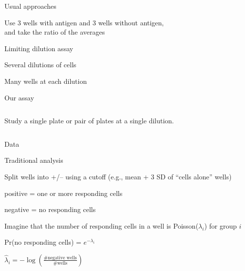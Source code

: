 \documentclass[aspectratio=169,12pt,t]{beamer}
\begin{document}
\begin{frame}{Usual approaches}

  \bbi

\item Use 3 wells with antigen and 3 wells without antigen,\\
  and take the ratio of the averages

  \item Limiting dilution assay
    \bi
  \item Several dilutions of cells
  \item Many wells at each dilution
    \ei
    \ei

\end{frame}


\begin{frame}[c]{Our assay}

  \begin{columns}[c]
    Study a single plate or pair of plates at a single dilution.



  \end{columns}


\end{frame}

\begin{frame}[c]{Data}
\end{frame}


\begin{frame}[c]{Traditional analysis}
  \bbi
  \item Split wells into +/-- using a cutoff (e.g., mean + 3 SD of
    ``cells alone'' wells)
    \bi
  \item[positive =] one or more responding cells
  \item[negative =] no responding cells
    \ei

  \item Imagine that the number of responding cells in a well is
    Poisson($\lambda_i$) for group $i$

    \vspace{4mm}

  \qquad Pr(no responding cells) = $e^{-\lambda_i}$

    \vspace{4mm}

  \qquad $\hat{\lambda}_i = -\log\left(\frac{\text{\# negative wells}}{\text{\# wells}}\right)$

    \ei

\end{frame}
\end{document}
